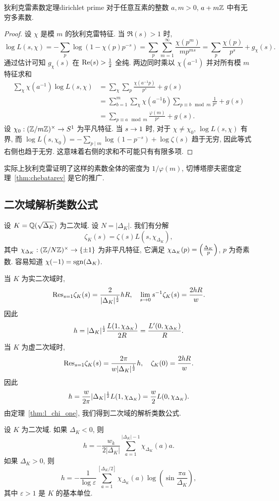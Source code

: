 \begin{theorem}{狄利克雷素数定理}{dirichlet prime}
对于任意互素的整数 $a,m>0$, $a+m{\mathbb{Z}}$ 中有无穷多素数.
\end{theorem}
\begin{proof}
设 $\chi$ 是模 $m$ 的狄利克雷特征. 当 $\Re(s)>1$ 时,
  \[\log L(s,\chi)=-\sum_p \log(1-\chi(p)p^{-s})=\sum_p\sum_{m=1}^\infty\frac{\chi(p^m)}{mp^{ms}}
    =\sum_p\frac{\chi(p)}{p^s}+g_\chi(s).\]
通过估计可知 $g_\chi(s)$ 在 ${\mathrm{Re}}(s)>\frac{1}{2}$ 全纯. 两边同时乘以 $\chi(a^{-1})$ 并对所有模 $m$ 特征求和
  \[\begin{split}
  \sum_\chi \chi(a^{-1}) \log L(s,\chi)&=\sum_\chi\sum_p\frac{\chi(a^{-1}p)}{p^s}+g(s)\\
    &=\sum_{b=1}^m\sum_\chi \chi(a^{-1}b)\sum_{p\equiv b\mod m}\frac{1}{p^s}+g(s)\\
    &=\sum_{p\equiv a\mod m}\frac{\varphi(m)}{p^s}+g(s).
  \end{split}\]
设 $\chi_0:({\mathbb{Z}}/m{\mathbb{Z}})^\times\to S^1$ 为平凡特征.
当 $s\rightarrow 1$ 时, 对于 $\chi\neq \chi_0$, $\log L(s,\chi)$ 有界, 而 $\log L(s,\chi_0)=-\sum_{p\mid m} \log(1-p^{-s})+\log \zeta(s)$ 趋于无穷, 因此等式右侧也趋于无穷. 这意味着右侧的求和不可能只有有限多项.
\end{proof}
\begin{remark}
实际上狄利克雷证明了这样的素数全体的密度为 $1/\varphi(m)$, 切博塔廖夫密度定理~\ref{thm:chebatarev} 是它的推广.
\end{remark}



\subsection{二次域解析类数公式}
设 $K={\mathbb{Q}}(\sqrt{\Delta_K})$ 为二次域. 设 $N=|\Delta_K|$. 我们有分解
  \[\zeta_K(s)=\zeta(s)L(s,\chi_{\Delta_K}),\]
其中 $\chi_{\Delta_K}:({\mathbb{Z}}/N{\mathbb{Z}})^\times\to\left\{\pm1\right\}$ 为非平凡特征, 它满足 $\chi_{\Delta_K}(p)=\left(\frac{{\Delta_K}}{p}\right)$, $p$ 为奇素数. 容易知道 $\chi(-1)={\mathrm{sgn}}(\Delta_K)$.

当 $K$ 为实二次域时,  
  \[{\mathrm{Res}}_{s=1} \zeta_K(s)=\frac{2}{|\Delta_K|^{\frac{1}{2}}} h R, \quad\lim_{s\rightarrow 0}s^{-1}\zeta_K(s)=\frac{2hR}{w}.\]
因此 
  \[h=|\Delta_K|^{\frac{1}{2}} \frac{L(1,\chi_{\Delta_K})}{2R}=\frac{L'(0,\chi_{\Delta_K})}{R}.\]
当 $K$ 为虚二次域时,
  \[{\mathrm{Res}}_{s=1} \zeta_K(s)=\frac{2\pi}{w|\Delta_K|^{\frac{1}{2}}} h, \quad\zeta_K(0)=\frac{2hR}{w}.\]
因此 
  \[h=\frac{w}{2\pi}|\Delta_K|^{\frac{1}{2}} L(1,\chi_{\Delta_K})=\frac{w}{2}L(0,\chi_{\Delta_K}).\]
由定理~\ref{thm:l_chi_one}, 我们得到二次域的解析类数公式.
\begin{theorem}{}{}
设 $K$ 为二次域. 如果 $\Delta_K<0$, 则
  \[h=-\frac{w_k}{2|\Delta_K|}\sum_{a=1}^{|\Delta_K|-1}\chi_{\Delta_K}(a)a.\]
如果 $\Delta_K>0$, 则 
  \[h=-\frac{1}{\log\varepsilon}\sum_{a=1}^{\left[\Delta_K/2\right]} \chi_{\Delta_K}(a)\log(\sin\frac{\pi a}{\Delta_K}),\]
其中 $\varepsilon>1$ 是 $K$ 的基本单位.
\end{theorem}


